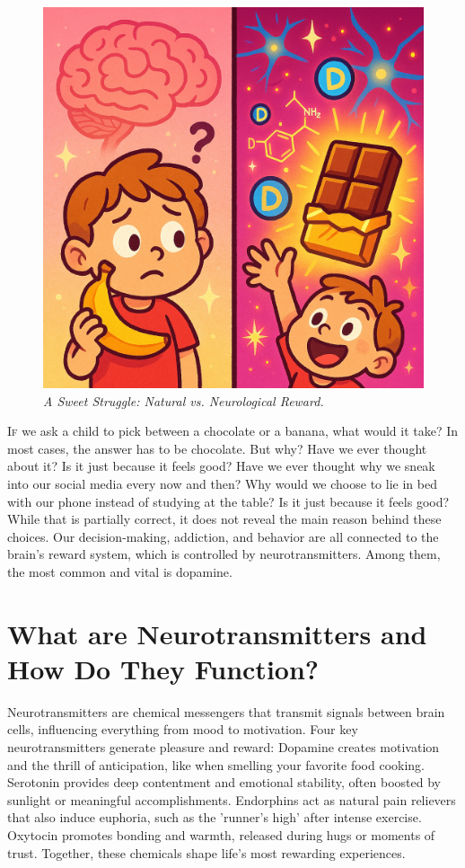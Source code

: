 \documentclass[a4paper,10pt,twocolumn]{memoir}
\begin{document}
{\begin{figure}[h!]
  \centering
  \includegraphics[width=0.9\linewidth]{banana.png}
  \caption*{\textit{A Sweet Struggle: Natural vs. Neurological Reward.}}
\end{figure}

\lettrine[lines=3]{I}{f} 
 we ask a child to pick between a chocolate or a banana, what would it take? In most cases, the answer has to be chocolate. But why? Have we ever thought about it? Is it just because it feels good? Have we ever thought why we sneak into our social media every now and then? Why would we choose to lie in bed with our phone instead of studying at the table? Is it just because it feels good? While that is partially correct, it does not reveal the main reason behind these choices. Our decision-making, addiction, and behavior are all connected to the brain’s reward system, which is controlled by neurotransmitters. Among them, the most common and vital is dopamine.

\section*{What are Neurotransmitters and How Do They Function?}

Neurotransmitters are chemical messengers that transmit signals between brain cells, influencing everything from mood to motivation. Four key neurotransmitters generate pleasure and reward: Dopamine creates motivation and the thrill of anticipation, like when smelling your favorite food cooking. Serotonin provides deep contentment and emotional stability, often boosted by sunlight or meaningful accomplishments. Endorphins act as natural pain relievers that also induce euphoria, such as the 'runner's high' after intense exercise. Oxytocin promotes bonding and warmth, released during hugs or moments of trust. Together, these chemicals shape life's most rewarding experiences.

}
\end{document}
